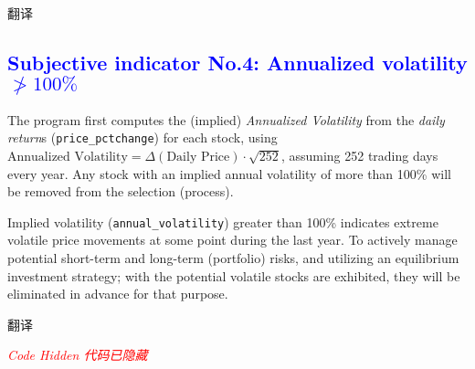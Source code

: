 \documentclass[
]{book}
\begin{document}
翻译

\hypertarget{section-3}{%
\subsection{\texorpdfstring{\textcolor{blue}{Subjective indicator No.4: Annualized volatility $\ngtr 100\%$}}{}}\label{section-3}}

The program first computes the (implied) \emph{Annualized Volatility}
from the \emph{daily return}s (\texttt{price\_pctchange}) for each
stock, using
\(\text{Annualized Volatility}=\Delta(\text{Daily Price})\cdot \sqrt{252}\),
assuming 252 trading days every year. Any stock with an implied annual
volatility of more than 100\% will be removed from the selection
(process).

Implied volatility (\texttt{annual\_volatility}) greater than 100\%
indicates extreme volatile price movements at some point during the last
year. To actively manage potential short-term and long-term (portfolio)
risks, and utilizing an equilibrium investment strategy; with the
potential volatile stocks are exhibited, they will be eliminated in
advance for that purpose.

翻译

\emph{\textcolor{red}{Code Hidden 代码已隐藏}}
\end{document}

